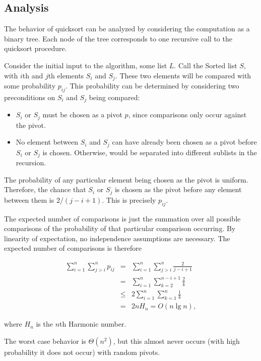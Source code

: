 \documentclass[12pt]{article}
\begin{document}
\subsection*{Analysis}
The behavior of quicksort can be analyzed by considering the
computation as a binary tree.  Each node of the tree corresponds to
one recursive call to the quicksort procedure.   

Consider the initial input to the algorithm, some list $L$.  Call the
Sorted list $S,$ with $i$th and $j$th elements $S_i$ and $S_j.$  These
two elements will be compared with some probability $p_{ij}$.  This
probability can be determined by considering two preconditions on
$S_i$ and $S_j$ being compared: 
\begin{itemize}
\item $S_i$ or $S_j$ must be chosen as a pivot $p$, since comparisons
only occur against the pivot.
\item No element between $S_i$ and $S_j$ can have already been chosen
as a pivot before $S_i$ or $S_j$ is chosen. Otherwise, would be
separated into different sublists in the recursion.
\end{itemize}

The probability of any particular element being chosen as the pivot is
uniform.  Therefore, the chance that $S_i$ or $S_j$ is chosen as the
pivot before any element between them is $2/(j-i+1)$.  This is
precisely $p_{ij}.$

The expected number of comparisons is just the summation over all
possible comparisons of the probability of that particular comparison
occurring.  By linearity of expectation, no independence assumptions
are necessary.  The expected number of comparisons is therefore

\begin{eqnarray}
\sum_{i=1}^{n}\sum_{j>i}^{n}p_{ij} & = & \sum_{i=1}^{n}\sum_{j>i}^{n}\frac{2}{j-i+1} \\
 & = & \sum_{i=1}^{n}\sum_{k=2}^{n-i+1}\frac{2}{k}\\
 & \le & 2\sum_{i=1}^{n}\sum_{k=1}^{n}\frac{1}{k}\\
 & = & 2nH_n = O(n\lg n),
\end{eqnarray}

where $H_n$ is the $n$th Harmonic number.

The worst case behavior is $\Theta(n^2)$, but this almost never occurs (with high probability it does not occur) with random pivots.
\end{document}
